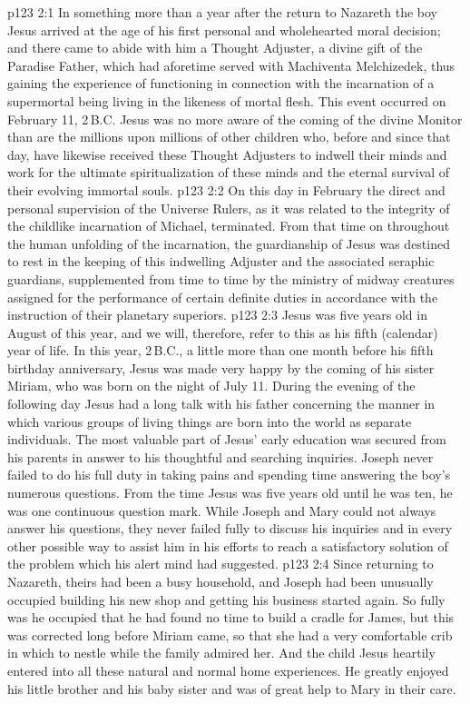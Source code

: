 \vs p123 2:1 In something more than a year after the return to Nazareth the boy Jesus arrived at the age of his first personal and wholehearted moral decision; and there came to abide with him a Thought Adjuster, a divine gift of the Paradise Father, which had aforetime served with Machiventa Melchizedek, thus gaining the experience of functioning in connection with the incarnation of a supermortal being living in the likeness of mortal flesh. This event occurred on February 11, 2\,B.C. Jesus was no more aware of the coming of the divine Monitor than are the millions upon millions of other children who, before and since that day, have likewise received these Thought Adjusters to indwell their minds and work for the ultimate spiritualization of these minds and the eternal survival of their evolving immortal souls.
\vs p123 2:2 On this day in February the direct and personal supervision of the Universe Rulers, as it was related to the integrity of the childlike incarnation of Michael, terminated. From that time on throughout the human unfolding of the incarnation, the guardianship of Jesus was destined to rest in the keeping of this indwelling Adjuster and the associated seraphic guardians, supplemented from time to time by the ministry of midway creatures assigned for the performance of certain definite duties in accordance with the instruction of their planetary superiors.
\vs p123 2:3 \pc Jesus was five years old in August of this year, and we will, therefore, refer to this as his fifth (calendar) year of life. In this year, 2\,B.C., a little more than one month before his fifth birthday anniversary, Jesus was made very happy by the coming of his sister Miriam, who was born on the night of July 11. During the evening of the following day Jesus had a long talk with his father concerning the manner in which various groups of living things are born into the world as separate individuals. The most valuable part of Jesus’ early education was secured from his parents in answer to his thoughtful and searching inquiries. Joseph never failed to do his full duty in taking pains and spending time answering the boy’s numerous questions. From the time Jesus was five years old until he was ten, he was one continuous question mark. While Joseph and Mary could not always answer his questions, they never failed fully to discuss his inquiries and in every other possible way to assist him in his efforts to reach a satisfactory solution of the problem which his alert mind had suggested.
\vs p123 2:4 Since returning to Nazareth, theirs had been a busy household, and Joseph had been unusually occupied building his new shop and getting his business started again. So fully was he occupied that he had found no time to build a cradle for James, but this was corrected long before Miriam came, so that she had a very comfortable crib in which to nestle while the family admired her. And the child Jesus heartily entered into all these natural and normal home experiences. He greatly enjoyed his little brother and his baby sister and was of great help to Mary in their care.
